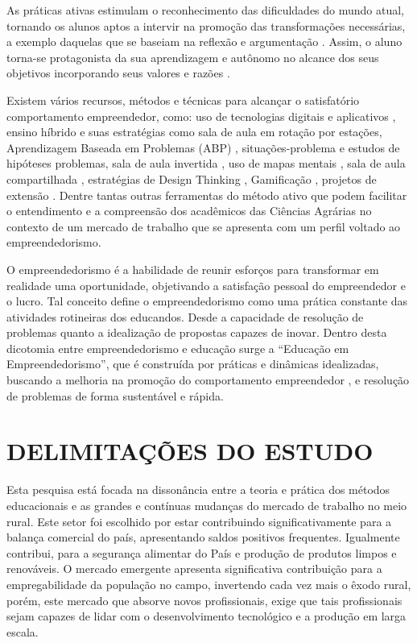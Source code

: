 As práticas ativas estimulam o reconhecimento das dificuldades do mundo atual, tornando os alunos aptos a intervir na promoção das transformações necessárias, a exemplo daquelas que se baseiam na reflexão e argumentação \cite{bezanilla_methodologies_2019}. Assim, o aluno torna-se protagonista da sua aprendizagem e autônomo no alcance dos seus objetivos incorporando seus valores e razões \cite{rubel_student_2016}.

Existem vários recursos, métodos e técnicas para alcançar o satisfatório comportamento empreendedor, como: uso de tecnologias digitais e aplicativos \cite{pereira_use_2020}, ensino híbrido e suas estratégias como sala de aula em rotação por estações, Aprendizagem Baseada em Problemas (ABP) \cite{souza_aprendizagem_2015}, situações-problema e estudos de hipóteses problemas, sala de aula invertida \cite{junior_sala_2016,branco_sala_2016}, uso de mapas mentais \cite{junior_percepcao_2018}, sala de aula compartilhada \cite{strack_por_2009}, estratégias de Design Thinking \cite{andrews_circular_2015}, Gamificação \cite{ogawa_avaliacao_2016}, projetos de extensão \cite{santos_projeto_2019}. Dentre tantas outras ferramentas do método ativo que podem facilitar o entendimento e a compreensão dos acadêmicos das Ciências Agrárias no contexto de um mercado de trabalho que se apresenta com um perfil voltado ao empreendedorismo.

O empreendedorismo é a habilidade de reunir esforços para transformar em realidade uma oportunidade, objetivando a satisfação pessoal do empreendedor e o lucro. Tal conceito define o empreendedorismo como uma prática constante das atividades rotineiras dos educandos. Desde a capacidade de resolução de problemas quanto a idealização de propostas capazes de inovar. Dentro desta dicotomia entre empreendedorismo e educação surge a “Educação em Empreendedorismo”, que é construída por práticas e dinâmicas idealizadas, buscando a melhoria na promoção do comportamento empreendedor \cite{martins_educacao_2016, morais_empreendedorismo_2018}, e resolução de problemas de forma sustentável e rápida.

\section{DELIMITAÇÕES DO ESTUDO}

Esta pesquisa está focada na dissonância entre a teoria e prática dos métodos educacionais e as grandes e contínuas mudanças do mercado de trabalho no meio rural. Este setor foi escolhido por estar contribuindo significativamente para a balança comercial do país, apresentando saldos positivos frequentes. Igualmente contribui, para a segurança alimentar do País e produção de produtos limpos e renováveis. O mercado emergente apresenta significativa contribuição para a empregabilidade da população no campo, invertendo cada vez mais o êxodo rural, porém, este mercado que absorve novos profissionais, exige que tais profissionais sejam capazes de lidar com o desenvolvimento tecnológico e a produção em larga escala. 

